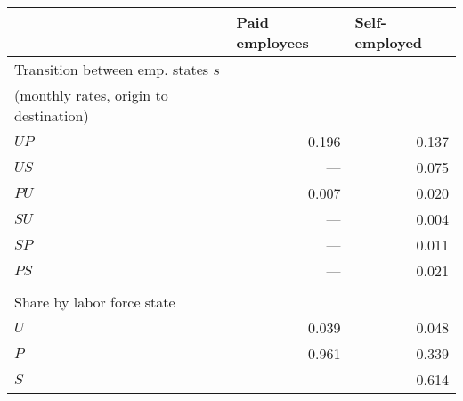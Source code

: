 \begin{tabular}{lrr}
\toprule
      & \multicolumn{1}{l}{Paid employees} & \multicolumn{1}{l}{Self-employed} \\
\midrule
Transition between emp. states $s$ &       &  \\
(monthly rates, origin to destination) &       &  \\
\quad $UP$ & 0.196 & 0.137 \\
\quad $US$ & ---   & 0.075 \\
\quad $PU$ & 0.007 & 0.020 \\
\quad $SU$ & ---   & 0.004 \\
\quad $SP$ & ---   & 0.011 \\
\quad $PS$ & ---   & 0.021 \\
      &       &  \\
Share by labor force state &       &  \\
\quad $U$ & 0.039 & 0.048 \\
\quad $P$ & 0.961 & 0.339 \\
\quad $S$ & ---   & 0.614 \\
\bottomrule
\end{tabular}%
